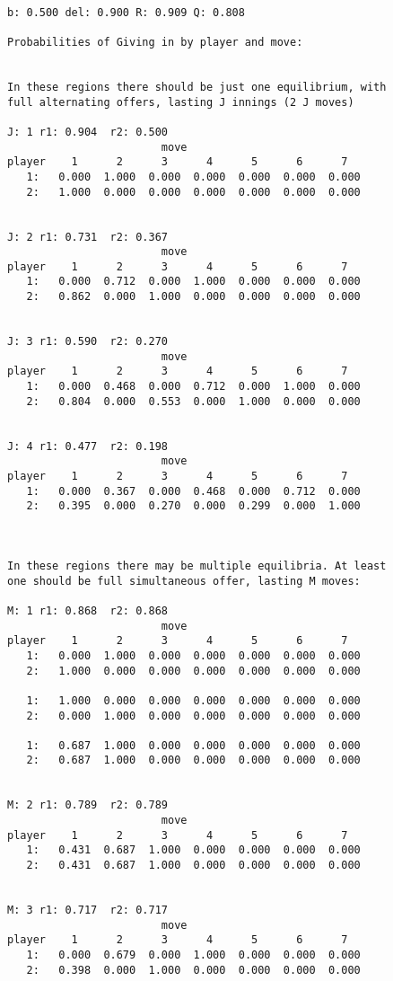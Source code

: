 {\scriptsize
\begin{verbatim}

b: 0.500 del: 0.900 R: 0.909 Q: 0.808

Probabilities of Giving in by player and move:


In these regions there should be just one equilibrium, with
full alternating offers, lasting J innings (2 J moves)
 
J: 1 r1: 0.904  r2: 0.500
                        move
player    1      2      3      4      5      6      7  
   1:   0.000  1.000  0.000  0.000  0.000  0.000  0.000  
   2:   1.000  0.000  0.000  0.000  0.000  0.000  0.000  


J: 2 r1: 0.731  r2: 0.367
                        move
player    1      2      3      4      5      6      7  
   1:   0.000  0.712  0.000  1.000  0.000  0.000  0.000  
   2:   0.862  0.000  1.000  0.000  0.000  0.000  0.000  


J: 3 r1: 0.590  r2: 0.270
                        move
player    1      2      3      4      5      6      7  
   1:   0.000  0.468  0.000  0.712  0.000  1.000  0.000  
   2:   0.804  0.000  0.553  0.000  1.000  0.000  0.000  


J: 4 r1: 0.477  r2: 0.198
                        move
player    1      2      3      4      5      6      7  
   1:   0.000  0.367  0.000  0.468  0.000  0.712  0.000  
   2:   0.395  0.000  0.270  0.000  0.299  0.000  1.000  



In these regions there may be multiple equilibria. At least 
one should be full simultaneous offer, lasting M moves:

M: 1 r1: 0.868  r2: 0.868
                        move
player    1      2      3      4      5      6      7  
   1:   0.000  1.000  0.000  0.000  0.000  0.000  0.000  
   2:   1.000  0.000  0.000  0.000  0.000  0.000  0.000  

   1:   1.000  0.000  0.000  0.000  0.000  0.000  0.000  
   2:   0.000  1.000  0.000  0.000  0.000  0.000  0.000  

   1:   0.687  1.000  0.000  0.000  0.000  0.000  0.000  
   2:   0.687  1.000  0.000  0.000  0.000  0.000  0.000  


M: 2 r1: 0.789  r2: 0.789
                        move
player    1      2      3      4      5      6      7  
   1:   0.431  0.687  1.000  0.000  0.000  0.000  0.000  
   2:   0.431  0.687  1.000  0.000  0.000  0.000  0.000  


M: 3 r1: 0.717  r2: 0.717
                        move
player    1      2      3      4      5      6      7  
   1:   0.000  0.679  0.000  1.000  0.000  0.000  0.000  
   2:   0.398  0.000  1.000  0.000  0.000  0.000  0.000  


\end{verbatim}}
